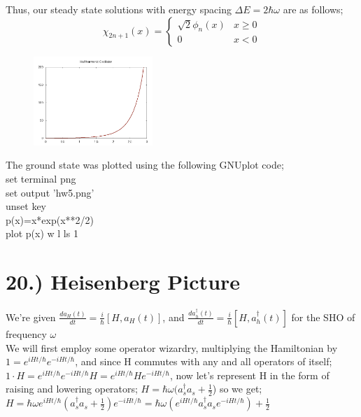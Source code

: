 \documentclass[12pt]{article}
\begin{document}
Thus, our steady state solutions with energy spacing  $\Delta E=2\hbar\omega$ are as follows;\\
\[
\chi_{2n+1}(x)=
\begin{cases}
\sqrt{2}\phi_n(x) & x\geq0\\
0 & x<0
\end{cases} 
\]
\linebreak
\begin{figure}
  \begin{center}
\includegraphics[width=0.4\textwidth]{hw5plot.png}
  \end{center}
\end{figure}

The ground state was plotted using the following GNUplot code;\\
set terminal png\\
set output 'hw5.png'\\
unset key\\
p(x)=x*exp(x**2/2)\\
plot p(x) w l ls 1\\
\pagebreak
\section*{20.) Heisenberg Picture}

We're given $\frac{da_H(t)}{dt}=\frac{i}{\hbar}[H,a_H(t)]$, and $\frac{da^\dagger_h(t)}{dt}=\frac{i}{\hbar}[H,a^\dagger_h(t)]$ for the SHO of frequency $\omega$\\

We will first employ some operator wizardry, multiplying the Hamiltonian by $1=e^{iHt/\hbar}e^{-iHt/\hbar}$, and since H commutes with any and all operators of itself;\\

$1\cdot H=e^{iHt/\hbar}e^{-iHt/\hbar}H=e^{iHt/\hbar}He^{-iHt/\hbar}$, now let's represent H in the form of raising and lowering operators; $H=\hbar\omega(a_s^\dagger a_s+\frac{1}{2}$) so we get;\\

$H=\hbar\omega e^{iHt/\hbar}(a^\dagger_s a_s +\frac{1}{2})e^{-iHt/\hbar}=\hbar\omega(e^{iHt/\hbar}a^\dagger_s a_se^{-iHt/\hbar})+\frac{1}{2}$\\
\end{document}
